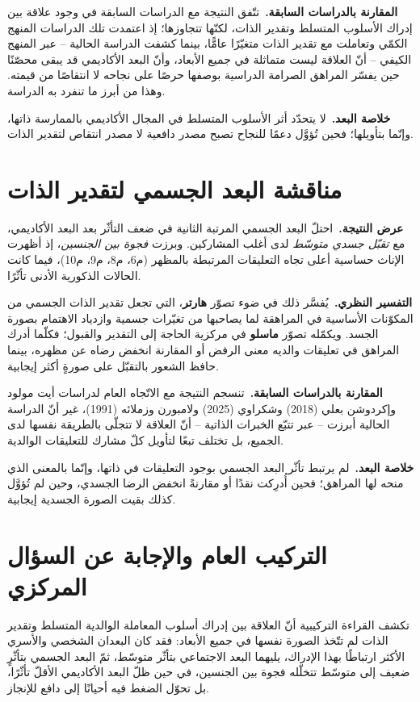\documentclass[12pt,oneside]{report}
\begin{document}
\noindent\textbf{المقارنة بالدراسات السابقة.}\ تتّفق النتيجة مع الدراسات السابقة في وجود علاقة
بين إدراك الأسلوب المتسلط وتقدير الذات، لكنّها تتجاوزها؛ إذ اعتمدت تلك الدراسات المنهج الكمّي
وتعاملت مع تقدير الذات متغيّرًا عامًّا، بينما كشفت الدراسة الحالية -- عبر المنهج الكيفي -- أنّ
العلاقة ليست متماثلة في جميع الأبعاد، وأنّ البعد الأكاديمي قد يبقى محصّنًا حين يفسّر المراهق
الصرامة الدراسية بوصفها حرصًا على نجاحه لا انتقاصًا من قيمته. وهذا من أبرز ما تنفرد به الدراسة.

\noindent\textbf{خلاصة البعد.}\ لا يتحدّد أثر الأسلوب المتسلط في المجال الأكاديمي بالممارسة ذاتها،
وإنّما بتأويلها؛ فحين تُؤوَّل دعمًا للنجاح تصبح مصدر دافعية لا مصدر انتقاص لتقدير الذات.

\section{مناقشة البعد الجسمي لتقدير الذات}
\noindent\textbf{عرض النتيجة.}\ احتلّ البعد الجسمي المرتبة الثانية في ضعف التأثّر بعد البعد
الأكاديمي، مع \emph{تقبّل جسدي متوسّط} لدى أغلب المشاركين. وبرزت \emph{فجوة بين الجنسين}، إذ
أظهرت الإناث حساسية أعلى تجاه التعليقات المرتبطة بالمظهر (م6، م8، م9، م10)، فيما كانت الحالات
الذكورية الأدنى تأثّرًا.

\noindent\textbf{التفسير النظري.}\ يُفسَّر ذلك في ضوء تصوّر \textbf{هارتر}، التي تجعل تقدير الذات
الجسمي من المكوّنات الأساسية في المراهقة لما يصاحبها من تغيّرات جسمية وازدياد الاهتمام بصورة
الجسد. ويكمّله تصوّر \textbf{ماسلو} في مركزية الحاجة إلى التقدير والقبول؛ فكلّما أدرك المراهق في
تعليقات والديه معنى الرفض أو المقارنة انخفض رضاه عن مظهره، بينما حافظ الشعور بالتقبّل على صورةٍ
أكثر إيجابية.

\noindent\textbf{المقارنة بالدراسات السابقة.}\ تنسجم النتيجة مع الاتّجاه العام لدراسات أيت مولود
وإكردوشن بعلي (2018) وشكراوي (2025) ولامبورن وزملائه (1991)، غير أنّ الدراسة الحالية أبرزت -- عبر
تتبّع الخبرات الذاتية -- أنّ العلاقة لا تتجلّى بالطريقة نفسها لدى الجميع، بل تختلف تبعًا لتأويل
كلّ مشارك للتعليقات الوالدية.

\noindent\textbf{خلاصة البعد.}\ لم يرتبط تأثّر البعد الجسمي بوجود التعليقات في ذاتها، وإنّما
بالمعنى الذي منحه لها المراهق؛ فحين أُدرِكت نقدًا أو مقارنةً انخفض الرضا الجسدي، وحين لم تُؤوَّل
كذلك بقيت الصورة الجسدية إيجابية.

\section{التركيب العام والإجابة عن السؤال المركزي}
تكشف القراءة التركيبية أنّ العلاقة بين إدراك أسلوب المعاملة الوالدية المتسلط وتقدير الذات لم
تتّخذ الصورة نفسها في جميع الأبعاد: فقد كان البعدان الشخصي والأسري الأكثر ارتباطًا بهذا الإدراك،
يليهما البعد الاجتماعي بتأثّر متوسّط، ثمّ البعد الجسمي بتأثّرٍ ضعيف إلى متوسّط تتخلّله فجوة بين
الجنسين، في حين ظلّ البعد الأكاديمي الأقلّ تأثّرًا، بل تحوّل الضغط فيه أحيانًا إلى دافع للإنجاز.
\end{document}
